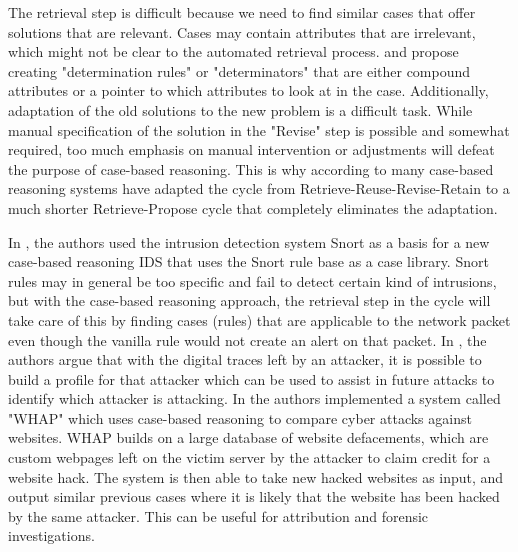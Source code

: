 The retrieval step is difficult because we need to find similar cases that offer solutions that are relevant. Cases may contain attributes that are irrelevant, which might not be clear to the automated retrieval process. \cite{lewis_1993} and \cite{davies_1987} propose creating "determination rules" or "determinators" that are either compound attributes or a pointer to which attributes to look at in the case.
Additionally, adaptation of the old solutions to the new problem is a difficult task. While manual specification of the solution in the "Revise" step is possible and somewhat required, too much emphasis on manual intervention or adjustments will defeat the purpose of case-based reasoning. This is why according to \cite{leake_1996} many case-based reasoning systems have adapted the cycle from Retrieve-Reuse-Revise-Retain to a much shorter Retrieve-Propose cycle that completely eliminates the adaptation.

In \cite{schwartz_2002}, the authors used the intrusion detection system Snort as a basis for a new case-based reasoning IDS that uses the Snort rule base as a case library. Snort rules may in general be too specific and fail to detect certain kind of intrusions, but with the case-based reasoning approach, the retrieval step in the cycle will take care of this by finding cases (rules) that are applicable to the network packet even though the vanilla rule would not create an alert on that packet.
In \cite{Kapetanakis_2014}, the authors argue that with the digital traces left by an attacker, it is possible to build a profile for that attacker which can be used to assist in future attacks to identify which attacker is attacking. In \cite{han_2016} the authors implemented a system called "WHAP" which uses case-based reasoning to compare cyber attacks against websites. WHAP builds on a large database of website defacements, which are custom webpages left on the victim server by the attacker to claim credit for a website hack. The system is then able to take new hacked websites as input, and output similar previous cases where it is likely that the website has been hacked by the same attacker. This can be useful for attribution and forensic investigations.

